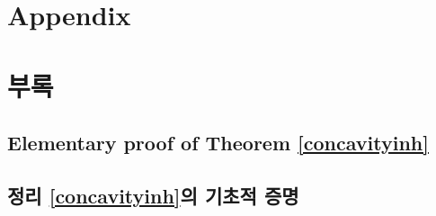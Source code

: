\documentclass[11pt]{article} %
\theoremstyle{definition}
\theoremstyle{definition}
\begin{document}
\appendix
\ifen \section{Appendix} \else \section{부록} \fi

\ifen \subsection{Elementary proof of Theorem \ref{concavityinh}} \else \subsection{정리 \ref{concavityinh}의 기초적 증명} \fi \label{elementaryconcavityproof}
\end{document}
